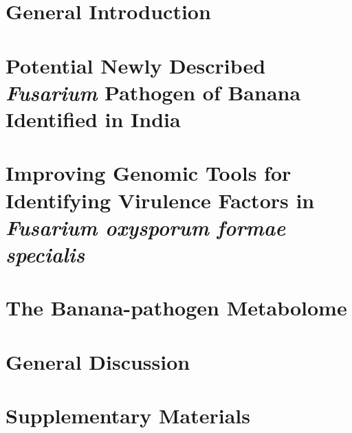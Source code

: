 \documentclass[11pt, a4paper, titles]{report}  %
\begin{document}
\clearpage

\setcounter{secnumdepth}{2}

      
\renewcommand{\arraystretch}{1.5} %

    
\chapter{General Introduction}\label{Chap1}
    
\chapter{Potential Newly Described \textit{Fusarium} Pathogen of Banana Identified in India}\label{Chap2}
    
\chapter{Improving Genomic Tools for Identifying Virulence Factors in  \textit{Fusarium oxysporum formae specialis}}\label{Chap3}
    
\chapter{The Banana-pathogen Metabolome}\label{Chap4}
     

\chapter{General Discussion}\label{Chap5}



\setcounter{secnumdepth}{-2}%


\cleardoublepage
{}
{}
\chapter*{\huge\centering Supplementary Materials}  

% 

% 


\end{document}
